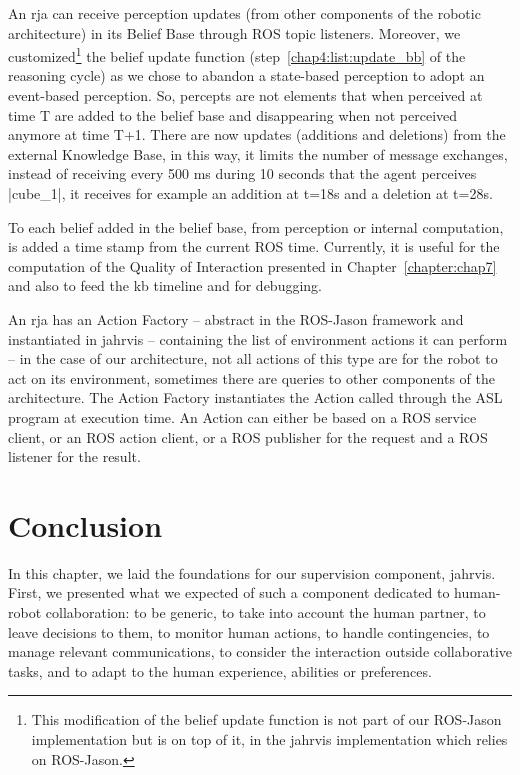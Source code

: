 \documentclass[a4paper,11pt,twoside]{StyleThese}
\begin{document}
An \acrshort{rja} can receive perception updates (from other components of the robotic architecture) in its Belief Base through ROS topic listeners. Moreover, we customized\footnote{This modification of the belief update function is not part of our ROS-Jason implementation but is on top of it, in the \acrshort{jahrvis} implementation which relies on ROS-Jason.} the belief update function (step~\ref{chap4:list:update_bb} of the reasoning cycle) as we chose to abandon a state-based perception to adopt an event-based perception. So, percepts are not elements that when perceived at time T are added to the belief base and disappearing when not perceived anymore at time T+1. There are now updates (additions and deletions) from the external Knowledge Base, in this way, it limits the number of message exchanges, \ie instead of receiving every 500 ms during 10 seconds that the agent perceives |cube_1|, it receives for example an addition at t=18s and a deletion at t=28s. 

To each belief added in the belief base, from perception or internal computation, is added a time stamp from the current ROS time. Currently, it is useful for the computation of the Quality of Interaction presented in Chapter~\ref{chapter:chap7} and also to feed the \acrshort{kb} timeline and for debugging.

An \acrshort{rja} has an Action Factory -- abstract in the ROS-Jason framework and instantiated in \acrshort{jahrvis} -- containing the list of environment actions it can perform -- in the case of our architecture, not all actions of this type are for the robot to act on its environment, sometimes there are queries to other components of the architecture. The Action Factory instantiates the Action called through the ASL program at execution time. An Action can either be based on a ROS service client, or an ROS action client, or a ROS publisher for the request and a ROS listener for the result. 

\section{Conclusion}

In this chapter, we laid the foundations for our supervision component, \acrshort{jahrvis}. First, we presented what we expected of such a component dedicated to human-robot collaboration: to be generic, to take into account the human partner, to leave decisions to them, to monitor human actions, to handle contingencies, to manage relevant communications, to consider the interaction outside collaborative tasks, and to adapt to the human experience, abilities or preferences.
\end{document}
